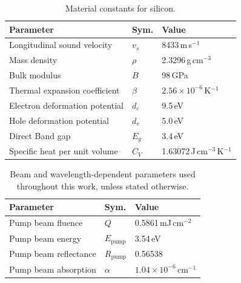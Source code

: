 \documentclass[aps,prb,10pt,showkeys,letterpaper,notitlepage,twocolumn]{revtex4-1}
\begin{document}
\begin{table}[b]
\caption{Material constants for silicon.}
\label{tab:constants}
\begin{ruledtabular}
\begin{tabular}{ l l l }
Parameter                               & Sym.      & Value                           \\
\hline
Longitudinal sound velocity             & $v_{s}$   & 8433\,m\,s$^{-1}$\cite{sisound} \\
Mass density                            & $\rho$    & 2.3296\,g\,cm$^{-3}$            \\
Bulk modulus                            & $B$       & 98\,GPa\cite{hopcroftJMS10}     \\
Thermal expansion coefficient           & $\beta$   & $2.56\times10^{-6}$\,K$^{-1}$   \\
Electron deformation potential          & $d_{c}$   & 9.5\,eV\cite{lundstrom2000}     \\%
Hole deformation potential              & $d_{v}$   & 5.0\,eV\cite{lundstrom2000}     \\%
Direct Band gap                         & $E_{g}$   & 3.4\,eV\cite{landolt}           \\
Specific heat per unit volume           & $C_{V}$   & 1.63072\,J\,cm$^{-3}$\,K$^{-1}$ \\
\end{tabular}
\end{ruledtabular}
\end{table}

\begin{table}[t]
\caption{Beam and wavelength-dependent parameters used throughout this work,
unless stated otherwise.}
\label{tab:params}
\begin{ruledtabular}
\begin{tabular}{ l l l }
Parameter               & Sym.                  & Value                          \\
\hline
Pump beam fluence       & $Q$                   & 0.5861\,mJ\,cm$^{-2}$          \\
Pump beam energy        & $E_{\mathrm{pump}}$   & 3.54\,eV                       \\
Pump beam reflectance   & $R_{\mathrm{pump}}$   & 0.56538                        \\
Pump beam absorption    & $\alpha$              & $1.04\times10^{-6}$\,cm$^{-1}$ \\
\end{tabular}
\end{ruledtabular}
\end{table}
\end{document}
